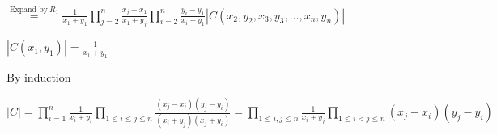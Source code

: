 \documentclass{article}
\begin{document}
$\overset{\text{Expand by}\ R_1}{=} \frac{1}{x_1+y_1}\prod_{j=2}^n\frac{x_j-x_1}{x_1+y_j} \prod_{i=2}^n\frac{y_i-y_1}{x_i + y_1} |C(x_2,y_2,x_3,y_3,\ldots,x_n,y_n)|$

$|C(x_1,y_1)| = \frac{1}{x_1+y_1}$

By induction

$|C| = \prod_{i=1}^n\frac{1}{x_i+y_i} \prod_{1 \leq i \leq j \leq n} \frac{(x_j-x_i)(y_j-y_i)}{(x_i+y_j)(x_j + y_i)} = \prod_{1 \leq i,j \leq n}\frac{1}{x_i+y_j} \prod_{1 \leq i < j \leq n} (x_j-x_i)(y_j-y_i)$
\end{document}
